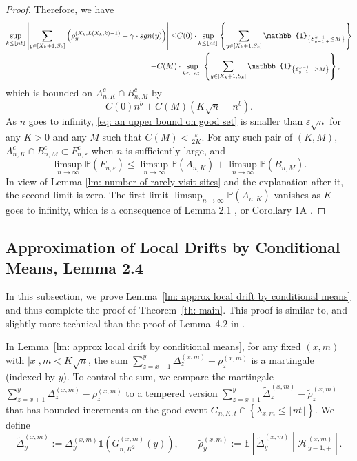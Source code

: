 \documentclass[EJP]{ejpecp} %
\newcommand{\abs}[1]{\left\vert #1 \right\vert}
\begin{document}
\begin{proof}
	Therefore, we have
	\begin{align*}
		\sup_{k\leq \left\lfloor n t\right\rfloor}  \abs{  	\sum_{y\in [X_{k}+1 ,S_k]} \left( \rho^{(X_k,L(X_k,k)-1)}_y -  \gamma \cdot sgn(y) \right) } \leq &  
		C(0) \cdot \sup_{k\leq \left\lfloor n t\right\rfloor} \left\{   	\sum_{y\in [X_{k}+1 ,S_k]} \mathbb{1}_{ \left\{ \mathcal{E}^{k-1}_{y-1,+} \leq M \right\} } \right\}
		\notag
		\\
		+ C(M)& \cdot \sup_{k\leq \left\lfloor n t\right\rfloor} \left\{   	\sum_{y\in [X_{k}+1 ,S_k]} \mathbb{1}_{ \left\{ \mathcal{E}^{k-1}_{y-1,+} \geq M \right\} } \right\},
	\end{align*} which is bounded on $A^c_{n,K} \cap B^c_{n,M}$ by
	\begin{equation}\label{eq: an upper bound on good set}
		C(0)n^b  + C(M) \left(K \sqrt{n} -n^b\right).
	\end{equation} 
	As $n$ goes to infinity, \eqref{eq: an upper bound on good set} is smaller than $\varepsilon \sqrt{n}$ for any $K>0$ and any $M$ such that $C(M) < \frac{\varepsilon}{2K}$. 
	For any such pair of $(K,M)$, $A^c_{n,K} \cap B^c_{n,M} \subset F^c_{n,\varepsilon}$ when $n$ is sufficiently large, and 
	\[
	\limsup_{n\to \infty} \mathbb{P}(F_{n,\varepsilon}) \leq \limsup_{n\to \infty}  \mathbb{P}(A_{n,K}) +  \limsup_{n\to \infty}  \mathbb{P}(B_{n,M}).
	\]
	In view of Lemma \ref{lm: number of rarely visit sites} and the explanation after it, the second limit is zero. The first limit $\limsup_{n\to \infty}  \mathbb{P}(A_{n,K}) $ vanishes as $K$ goes to infinity, which is a consequence of Lemma 2.1 \cite{KMP23}, or Corollary 1A \cite{T96}.
\end{proof}


\subsection{Approximation of Local Drifts by Conditional Means, Lemma 2.4}
\label{sec:DeltaRho}
In this subsection, we prove Lemma~\ref{lm: approx local drift by conditional means} and thus complete the proof of Theorem~\ref{th: main}. This proof is similar to, and slightly more technical than the proof of {Lemma~4.2} in \cite{KP16}. 

In Lemma~\ref{lm: approx local drift by conditional means}, for any fixed $(x,m)$ with $\abs{x},m < K\sqrt{n}$, the sum $\sum_{z=x+1}^{y}  \Delta_z^{(x,m)} - \rho_z^{(x,m)}  $ is a martingale (indexed by $y$). To control the sum, we compare the martingale $\sum_{z=x+1}^{y} \Delta_z^{(x,m)} - \rho_z^{(x,m)}$ to a tempered version $\sum_{z= x+1}^y \tilde \Delta_{z}^{(x,m)} - \tilde\rho_z^{(x,m)}$ that has bounded increments on the good event $G_{n, K, t} \cap \left\{\lambda_{x,m} \leq\lfloor nt \rfloor \right\}$. We define
\[
\tilde \Delta_y^{(x,m)} := \Delta_y ^{(x,m)} \mathbb{1}\left( G_{n, K^2}^{(x,m)} (y)\right), \qquad
\tilde \rho_y^{(x,m)} := \mathbb{E}\left[ \tilde\Delta_y^{(x,m)} \middle| \mathcal{H}_{y-1, +}^{(x,m)} \right]  
.\] 
\end{document}
